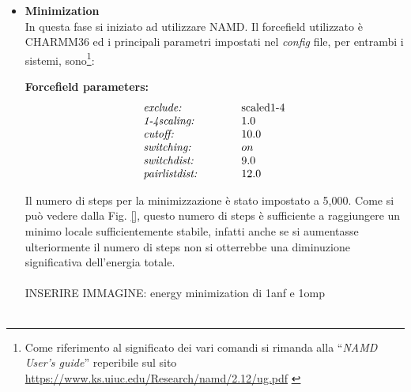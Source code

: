 \begin{itemize}
\item \textbf{Minimization}\\
In questa fase si iniziato ad utilizzare NAMD. Il forcefield utilizzato è CHARMM36 ed i principali parametri impostati nel \textit{config} file, per entrambi i sistemi, sono\footnote{Come riferimento al significato dei vari comandi si rimanda alla ``\textit{NAMD User's guide}'' reperibile sul sito \url{https://www.ks.uiuc.edu/Research/namd/2.12/ug.pdf} \cite{ref:NAMD_ug}}:\\
\begin{center}
\textbf{Forcefield parameters:}
\vspace{-0.25cm}
\begin{equation*}
\begin{array}{ll}
\text{\textit{exclude:}} \qquad\quad & \text{scaled1-4}\\
\text{\textit{1-4scaling:}} \qquad\quad & 1.0\\
\text{\textit{cutoff:}} \qquad\quad & 10.0\\
\text{\textit{switching:}} \qquad\quad & on\\
\text{\textit{switchdist:}} \qquad\quad & 9.0\\
\text{\textit{pairlistdist:}} \qquad\quad & 12.0\\
\end{array}
\end{equation*}
\end{center}
Il numero di steps per la minimizzazione è stato impostato a 5,000. Come si può vedere dalla Fig. \ref{}, questo numero di steps è sufficiente a raggiungere un minimo locale sufficientemente stabile, infatti anche se si aumentasse ulteriormente il numero di steps non si otterrebbe una diminuzione significativa dell'energia totale.\\
\\
INSERIRE IMMAGINE: energy minimization di 1anf e 1omp\\
\\


\end{itemize}
